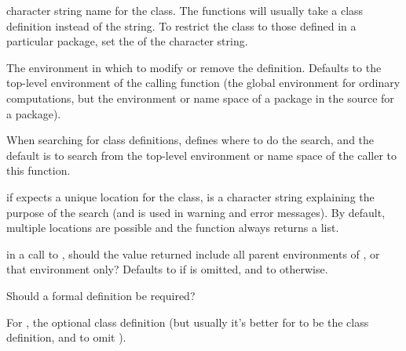 %
\begin{Arguments}
\begin{ldescription}
\item[\code{Class}] character string name for the class.  The functions will
usually take a class definition instead of the string.  To restrict
the class to those defined in a particular package, set the
 of the character string.
\item[\code{where}]  The
environment in which to modify or remove the
definition.  Defaults to the top-level environment of the calling function
(the global environment for ordinary computations, but the
environment or name space of a package in the source for a package).

When searching for class definitions,  defines where to
do the search, and the default is to search from the top-level
environment or name space of the caller to this function.

\item[\code{unique}] if  expects a unique location for the
class,  is a character string explaining the purpose
of the search (and is used in warning and error messages).  By
default, multiple locations are possible and the function always
returns a list.

\item[\code{inherits}] in a call to , should the value
returned include all parent environments of , or that
environment only?  Defaults to  if  is
omitted, and to  otherwise.

\item[\code{formal}]  Should a formal definition be required? 
\item[\code{classDef}]  For , the optional class
definition (but usually it's better for  to be the
class definition, and to omit ).

\end{ldescription}
\end{Arguments}
%

